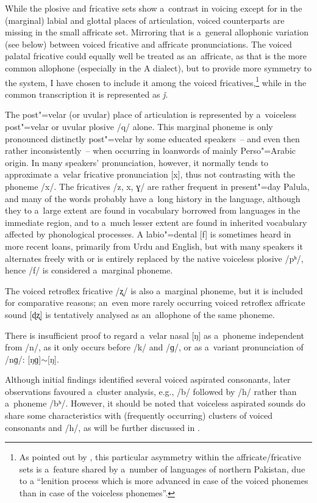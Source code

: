 While the plosive and fricative sets show a~contrast in voicing except for in the (marginal) labial and glottal places of articulation, voiced counterparts are missing in the small affricate set. Mirroring that is a~general allophonic variation (see below) between voiced fricative and affricate pronunciations. The voiced palatal fricative could equally well be treated as an~affricate, as that is the more common allophone (especially in the A dialect), but to provide more symmetry to the system, I have chosen to include it among the voiced fricatives,\footnote{As pointed out by \citet[34]{zoller2005}, this particular asymmetry within the affricate/fricative sets is a~feature shared by a~number of languages of northern Pakistan, due to a ``lenition process which is more advanced in case of the voiced phonemes than in case of the voiceless phonemes''.} while in the common transcription it is represented as \textit{ǰ}.


The post"=velar (or uvular) place of articulation is represented by a~voiceless post"=velar or uvular plosive /q/ alone. This marginal phoneme is only pronounced distinctly post"=velar by some educated speakers~-- and even then rather inconsistently~-- when occurring in loanwords of mainly Perso"=Arabic origin. In many speakers' pronunciation, however, it normally tends to approximate a~velar fricative pronunciation [x], thus not contrasting with the phoneme /x/. The fricatives /z, x, ɣ/ are rather frequent in present"=day Palula, and many of the words probably have a~long history in the language, although they to a~large extent are found in vocabulary borrowed from languages in the immediate region, and to a~much lesser extent are found in inherited vocabulary affected by phonological processes. A labio"=dental [f] is sometimes heard in more recent loans, primarily from Urdu and English, but with many speakers it alternates freely with or is entirely replaced by the native voiceless plosive /pʰ/, hence /f/ is considered a~marginal phoneme. 


The voiced retroflex fricative /ʐ/ is also a~marginal phoneme, but it is included for comparative reasons; an~even more rarely occurring voiced retroflex affricate sound [ɖʐ] is tentatively analysed as an~allophone of the same phoneme. 


There is insufficient proof to regard a~velar nasal [ŋ] as a~phoneme independent from /n/, as it only occurs before /k/ and /ɡ/, or as a~variant pronunciation of /nɡ/: [ŋɡ]$\sim$[ŋ]. 


Although initial findings identified several voiced aspirated consonants, later observations favoured a~cluster analysis, e.g., /b/ followed by /h/ rather than a~phoneme /bʰ/. However, it should be noted that voiceless aspirated sounds do share some characteristics with (frequently occurring) clusters of voiced consonants and /h/, as will be further discussed in .

